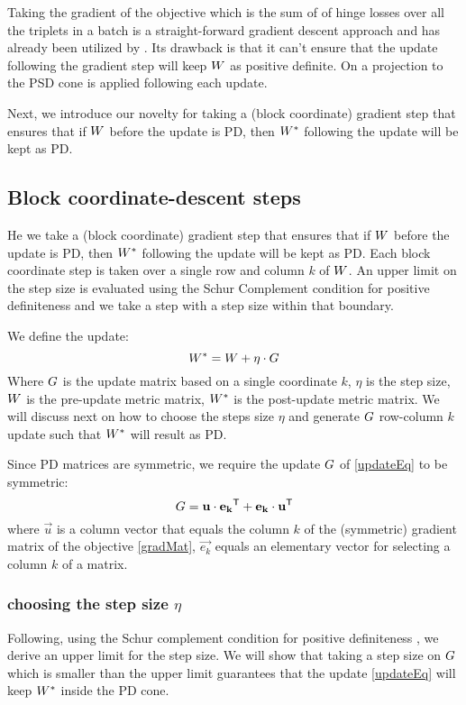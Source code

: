 \documentclass{article}
\begin{document}
Taking the gradient of the objective which is the sum of of hinge losses over all the triplets in a batch is a straight-forward gradient descent approach and has already been utilized by \cite{qian}. Its drawback is that it can't ensure that the update following the gradient step will keep ${W}$ as positive definite. On \cite{qian} a projection to the PSD cone is applied following each update. 

Next, we introduce our novelty for taking a (block coordinate) gradient step that ensures that if ${W}$ before the update is PD, then ${{W^*}}$ following the update will be kept as PD. 

\subsection{Block coordinate-descent steps}
He we take a (block coordinate) gradient step that ensures that if ${W}$ before the update is PD, then ${{W^*}}$ following the update will be kept as PD. Each block coordinate step is taken over a single row and column $k$ of ${W}$. An upper limit on the step size is evaluated using the Schur Complement condition for positive definiteness and we take a step with a step size within that boundary. 

We define the update:
\begin{equation}
   {{W^*}} = {W} +\eta\cdot{G}
   \label{updateEq}
\end{equation}
Where ${G}$ is the update matrix based on a single coordinate $k$, $\eta$ is the step size, ${W}$ is the pre-update metric matrix, ${{W^*}}$ is the post-update metric matrix. We will discuss next on how to choose the steps size $\eta$ and generate ${G}$ row-column $k$ update such that ${{W^*}}$ will result as PD. 


Since PD matrices are symmetric, we require the update ${G}$ of \eqref{updateEq} to be symmetric:
\begin{equation}
{G} = \mathbf{u}\cdot\mathbf{e_k}{}^\mathsf{T} + \mathbf{e_k}\cdot\mathbf{u}{}^\mathsf{T}
\label{gradMtx}
\end{equation}
where  $\vec{u}$ is a column vector that equals the column $k$ of the (symmetric) gradient matrix of the objective \eqref{gradMat}, $\vec{e_k}$ equals an elementary vector for selecting a column $k$ of a matrix. 

\subsubsection{choosing the step size $\eta$}
Following, using the Schur complement condition for positive definiteness , we derive an upper limit for the step size. We will show that taking a step size on ${G}$ which is smaller than the upper limit guarantees that the update \eqref{updateEq} will keep ${{W^*}}$ inside the PD cone. 
\end{document}
